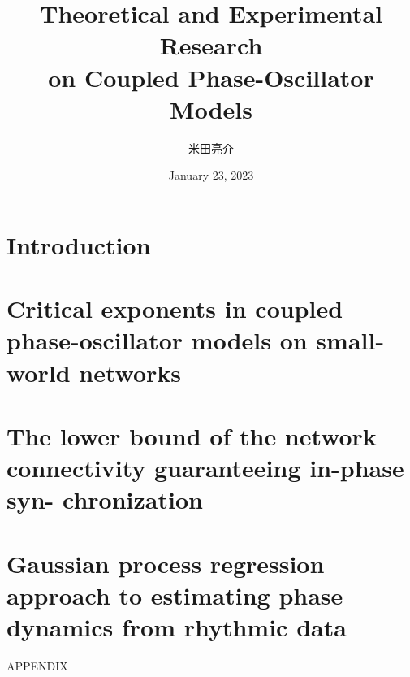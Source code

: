 \documentclass[serif,dvipdfmx,10pt]{beamer}
\title[Coupled Phase-Oscillator Models]{Theoretical and Experimental Research\\on Coupled Phase-Oscillator Models}
\author{米田亮介}
\date{January 23, 2023}
\institute[Kyoto Uni.]{Graduate School of Informatics, Kyoto University}
\begin{document}
\begin{frame}
  \titlepage
\end{frame}

\section{Introduction}



\section{Critical exponents in coupled phase-oscillator models on small-world networks}



\section{The lower bound of the network connectivity guaranteeing in-phase syn- chronization}



\section{Gaussian process regression approach to estimating phase dynamics from rhythmic data}


\appendix

\begin{frame}
    \centerline{\LARGE{APPENDIX}}
\end{frame}


\end{document}
